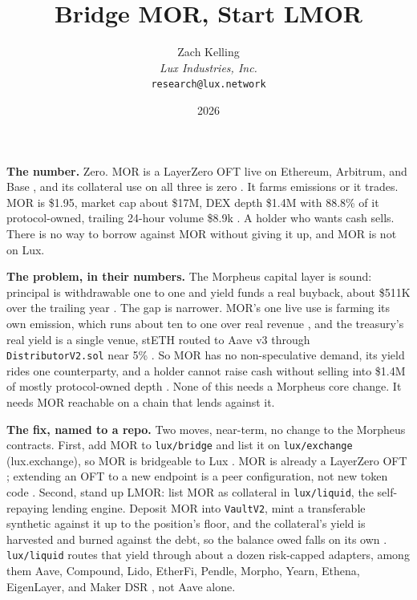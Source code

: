 \documentclass[11pt,a4paper]{article}
\title{Bridge MOR, Start LMOR}
\author{Zach Kelling\\\textit{Lux Industries, Inc.}\\\texttt{research@lux.network}}
\date{2026}
\newcommand{\code}[1]{\texttt{\small #1}}
\newcommand{\prov}[1]{{\color{muted}\scriptsize\sffamily[#1]}}
\begin{document}
\luxcoverpage
\sloppy

\par
\vspace{0.9ex}

\noindent\textbf{The number.}
Zero. MOR is a LayerZero OFT live on Ethereum, Arbitrum, and Base \prov{verified}, and its
collateral use on all three is zero \prov{verified}. It farms emissions or it trades. MOR is
\$1.95, market cap about \$17M, DEX depth \$1.4M with 88.8\% of it protocol-owned, trailing
24-hour volume \$8.9k \prov{verified}. A holder who wants cash sells. There is no way to borrow
against MOR without giving it up, and MOR is not on Lux.

\vspace{0.35ex}
\noindent\textbf{The problem, in their numbers.}
The Morpheus capital layer is sound: principal is withdrawable one to one and yield funds a real
buyback, about \$511K over the trailing year \prov{verified}. The gap is narrower. MOR's one live
use is farming its own emission, which runs about ten to one over real revenue \prov{verified}, and
the treasury's real yield is a single venue, stETH routed to Aave v3 through \code{DistributorV2.sol}
near 5\% \prov{verified}. So MOR has no non-speculative demand, its yield rides one counterparty, and
a holder cannot raise cash without selling into \$1.4M of mostly protocol-owned depth \prov{verified}.
None of this needs a Morpheus core change. It needs MOR reachable on a chain that lends against it.

\vspace{0.35ex}
\noindent\textbf{The fix, named to a repo.}
Two moves, near-term, no change to the Morpheus contracts. First, add MOR to \code{lux/bridge} and
list it on \code{lux/exchange} (lux.exchange), so MOR is bridgeable to Lux \prov{verified repo}. MOR
is already a LayerZero OFT \prov{verified}; extending an OFT to a new endpoint is a peer
configuration, not new token code \prov{derived}. Second, stand up LMOR: list MOR as collateral in
\code{lux/liquid}, the self-repaying lending engine. Deposit MOR into \code{VaultV2}, mint a
transferable synthetic against it up to the position's floor, and the collateral's yield is harvested
and burned against the debt, so the balance owed falls on its own \prov{verified repo}.
\code{lux/liquid} routes that yield through about a dozen risk-capped adapters, among them Aave,
Compound, Lido, EtherFi, Pendle, Morpho, Yearn, Ethena, EigenLayer, and Maker DSR
\prov{verified repo}, not Aave alone.
\end{document}

